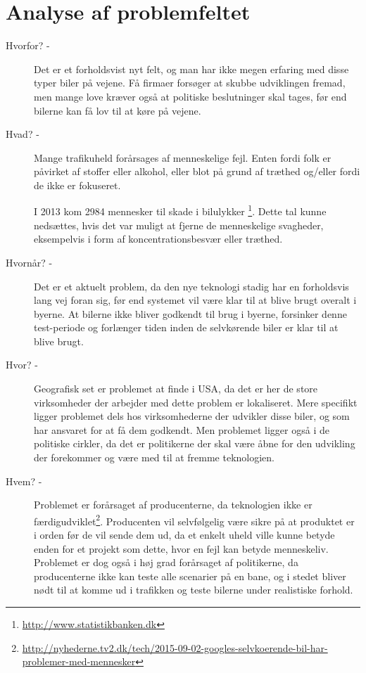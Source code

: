 \documentclass{article}
\begin{document}
	\section*{Analyse af problemfeltet}
	\begin{description}
		\item[Hvorfor? -] Det er et forholdsvist nyt felt, og man har ikke megen erfaring med disse typer biler på vejene. Få firmaer forsøger at skubbe udviklingen fremad, men mange love kræver også at politiske beslutninger skal tages, før end bilerne kan få lov til at køre på vejene.

		\item[Hvad? -] Mange trafikuheld forårsages af menneskelige fejl. Enten fordi folk er påvirket af stoffer eller alkohol, eller blot på grund af træthed og/eller fordi de ikke er fokuseret.

		I 2013 kom 2984 mennesker til skade i bilulykker \footnote{\url{http://www.statistikbanken.dk}}. Dette tal kunne nedsættes, hvis det var muligt at fjerne de menneskelige svagheder, eksempelvis i form af koncentrationsbesvær eller træthed.

		\item[Hvornår? -] Det er et aktuelt problem, da den nye teknologi stadig har en forholdsvis lang vej foran sig, før end systemet vil være klar til at blive brugt overalt i byerne. At bilerne ikke bliver godkendt til brug i byerne, forsinker denne test-periode og forlænger tiden inden de selvkørende biler er klar til at blive brugt.

		\item[Hvor? -] Geografisk set er problemet at finde i USA, da det er her de store virksomheder der arbejder med dette problem er lokaliseret. Mere specifikt ligger problemet dels hos virksomhederne der udvikler disse biler, og som har ansvaret for at få dem godkendt. Men problemet ligger også i de politiske cirkler, da det er politikerne der skal være åbne for den udvikling der forekommer og være med til at fremme teknologien.

		\item[Hvem? -] Problemet er forårsaget af producenterne, da teknologien ikke er færdigudviklet\footnote{\url{http://nyhederne.tv2.dk/tech/2015-09-02-googles-selvkoerende-bil-har-problemer-med-mennesker}}. Producenten vil selvfølgelig være sikre på at produktet er i orden før de vil sende dem ud, da et enkelt uheld ville kunne betyde enden for et projekt som dette, hvor en fejl kan betyde menneskeliv. Problemet er dog også i høj grad forårsaget af politikerne, da producenterne ikke kan teste alle scenarier på en bane, og i stedet bliver nødt til at komme ud i trafikken og teste bilerne under realistiske forhold. 


\end{description}
\end{document}
